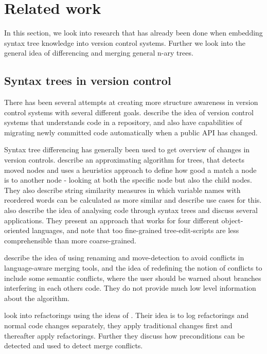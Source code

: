 \documentclass[11pt]{article}
\begin{document}
\section{Related work}
In this section, we look into research that has already been done when embedding syntax tree knowledge into version control systems. Further we look into the general idea of differencing and merging general n-ary trees.

\subsection{Syntax trees in version control}
\label{SyntaxTreesVersionControl}
There has been several attempts at creating more structure awareness in version control systems with several different goals. \citet{Freese} describe the idea of version control systems that understands code in a repository, and also have capabilities of migrating newly committed code automatically when a public API has changed.

Syntax tree differencing has generally been used to get overview of changes in version controls. \citet{Fluri} describe an approximating algorithm for trees, that  detects moved nodes and uses a heuristics approach to define how good a match a node is to another node - looking at both the specific node but also the child nodes. They also describe string similarity measures in which variable names with reordered words can be calculated as more similar and describe use cases for this. \citet{Hashimoto} also describe the idea of analysing code through syntax trees and discuss several applications. They present an approach that works for four different object-oriented languages, and note that too fine-grained tree-edit-scripts are less comprehensible than more coarse-grained.

\citet{Hunt} describe the idea of using renaming and move-detection to avoid conflicts in language-aware merging tools, and the idea of redefining the notion of conflicts to include some semantic conflicts, where the user should be warned about branches interfering in each others code. They do not provide much low level information about the algorithm.

\citet{Ekman} look into refactorings using the ideas of \citet{Lippe}. Their idea is to log refactorings and normal code changes separately, they apply traditional changes first and thereafter apply refactorings. Further they discuss how preconditions can be detected and used to detect merge conflicts.
\end{document}
